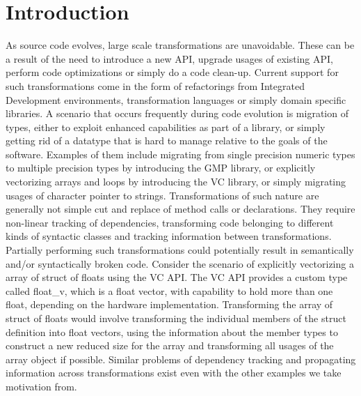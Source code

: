 \documentclass[preprint]{sigplanconf}
\begin{document}
\section{Introduction}
As source code evolves, large scale transformations are unavoidable. These can be a result of the need to introduce a new API, upgrade usages of existing API, perform code optimizations or simply do a code clean-up. Current support for such transformations come in the form of refactorings from Integrated Development environments, transformation languages or simply domain specific libraries. A scenario that occurs frequently during code evolution is migration of types, either to exploit enhanced capabilities as part of a library, or simply getting rid of a datatype that is hard to manage relative to the goals of the software. Examples of them include migrating from single precision numeric types to multiple precision types by introducing the GMP library, or explicitly vectorizing arrays and loops by introducing the VC library, or simply migrating usages of character pointer to strings. 
                             Transformations of such nature are generally not simple cut and replace of method calls or declarations. They require non-linear tracking of dependencies, transforming code belonging to different kinds of syntactic classes and tracking information between transformations. Partially performing such transformations could potentially result in semantically and/or syntactically broken code. Consider the scenario of explicitly vectorizing a array of struct of floats using the VC API. The VC API provides a custom type called float\_v, which is a float vector, with capability to hold more than one float, depending on the hardware implementation. Transforming the array of struct of floats would involve transforming the individual members of the struct definition into float vectors, using the information about the member types to construct a new reduced size for the array and transforming all usages of the array object if possible. Similar problems of dependency tracking and propagating information across transformations exist even with the other examples we take motivation from. 
\end{document}
